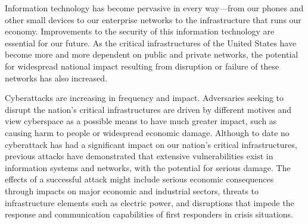 \documentclass[journal]{IEEEtran}
\begin{document}
%



Information technology has become pervasive in every way—from our phones and other small devices to our enterprise networks to the infrastructure that runs our economy. Improvements to the security of this information technology are essential for our future. As the critical infrastructures of the United States have become more and more dependent on public and private networks, the potential for widespread national impact resulting from disruption or failure of these networks has also increased.

Cyberattacks are increasing in frequency and impact. Adversaries seeking to disrupt the nation’s critical infrastructures are driven by different motives and view cyberspace as a possible
means to have much greater impact, such as causing harm to people or widespread
economic damage. Although to date no cyberattack has had a significant impact on
our nation’s critical infrastructures, previous attacks have demonstrated that extensive vulnerabilities exist in information systems and networks, with the potential for serious damage. The effects of a successful attack might include serious economic consequences through impacts on major economic and industrial sectors, threats to infrastructure elements such as electric power, and disruptions that impede the
response and communication capabilities of first responders in crisis situations.
\end{document}
